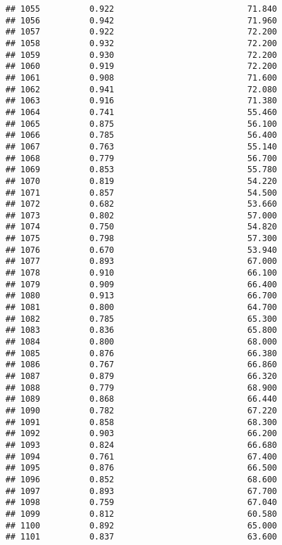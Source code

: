 \documentclass[
]{article}
\begin{document}
\begin{verbatim}
## 1055          0.922                           71.840
## 1056          0.942                           71.960
## 1057          0.922                           72.200
## 1058          0.932                           72.200
## 1059          0.930                           72.200
## 1060          0.919                           72.200
## 1061          0.908                           71.600
## 1062          0.941                           72.080
## 1063          0.916                           71.380
## 1064          0.741                           55.460
## 1065          0.875                           56.100
## 1066          0.785                           56.400
## 1067          0.763                           55.140
## 1068          0.779                           56.700
## 1069          0.853                           55.780
## 1070          0.819                           54.220
## 1071          0.857                           54.500
## 1072          0.682                           53.660
## 1073          0.802                           57.000
## 1074          0.750                           54.820
## 1075          0.798                           57.300
## 1076          0.670                           53.940
## 1077          0.893                           67.000
## 1078          0.910                           66.100
## 1079          0.909                           66.400
## 1080          0.913                           66.700
## 1081          0.800                           64.700
## 1082          0.785                           65.300
## 1083          0.836                           65.800
## 1084          0.800                           68.000
## 1085          0.876                           66.380
## 1086          0.767                           66.860
## 1087          0.879                           66.320
## 1088          0.779                           68.900
## 1089          0.868                           66.440
## 1090          0.782                           67.220
## 1091          0.858                           68.300
## 1092          0.903                           66.200
## 1093          0.824                           66.680
## 1094          0.761                           67.400
## 1095          0.876                           66.500
## 1096          0.852                           68.600
## 1097          0.893                           67.700
## 1098          0.759                           67.040
## 1099          0.812                           60.580
## 1100          0.892                           65.000
## 1101          0.837                           63.600

\end{verbatim}
\end{document}
